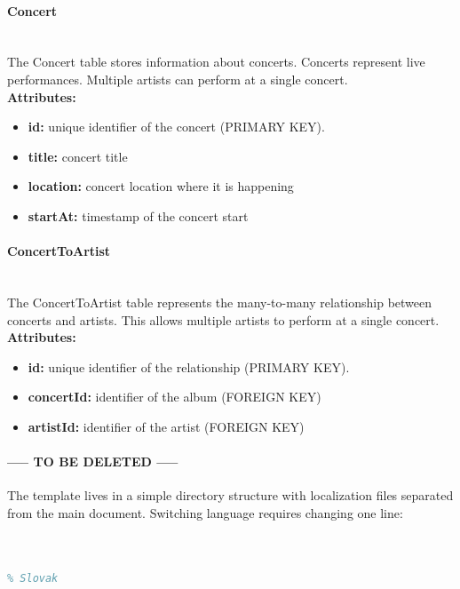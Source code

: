 \documentclass[11pt, a4paper]{article}
\begin{document}
\paragraph{Concert}~\\
The Concert table stores information about concerts. Concerts represent live performances. Multiple artists can perform at a single concert.
~\\\textbf{Attributes:}
\begin{itemize}
    \item \textbf{id:} unique identifier of the concert (PRIMARY KEY).
    \item \textbf{title:} concert title
    \item \textbf{location:} concert location where it is happening
    \item \textbf{startAt:} timestamp of the concert start
\end{itemize}

\paragraph{ConcertToArtist}~\\
The ConcertToArtist table represents the many-to-many relationship between concerts and artists. This allows multiple artists to perform at a single concert.
~\\\textbf{Attributes:}
\begin{itemize}
    \item \textbf{id:} unique identifier of the relationship (PRIMARY KEY).
    \item \textbf{concertId:} identifier of the album (FOREIGN KEY)
    \item \textbf{artistId:} identifier of the artist (FOREIGN KEY)
\end{itemize}


\paragraph{----- TO BE DELETED -----}
The template lives in a simple directory structure with localization files
separated from the main document. Switching language requires changing one
line:


\begin{lstlisting}[language=TeX, caption={Switching language in the preamble}]
% English


% Slovak

\end{lstlisting}
\end{document}
